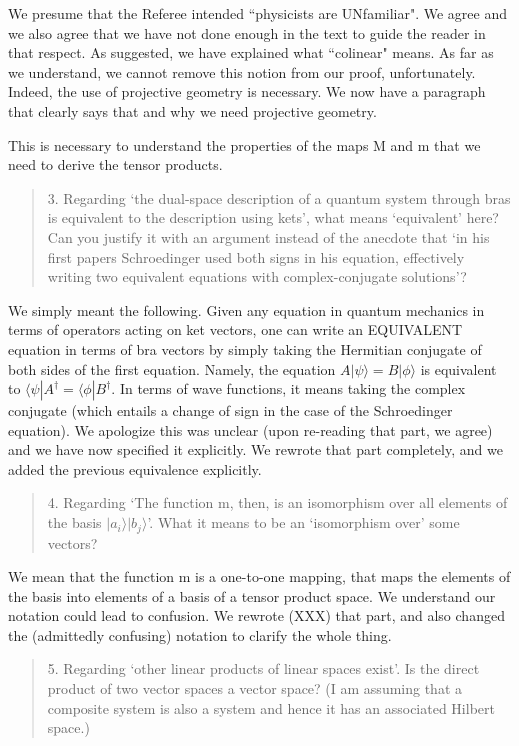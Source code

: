 \documentclass[11pt]{article}
\def\>{\rangle}
\def\<{\langle}
\begin{document}
We presume that the Referee intended ``physicists are UNfamiliar".  We
agree and we also agree that we have not done enough in the text to
guide the reader in that respect. As suggested, we have explained what
``colinear" means. As far as we understand, we cannot remove this
notion from our proof, unfortunately. Indeed, the use of projective
geometry is necessary. We now have a paragraph that clearly says that
and why we need projective geometry.

This is necessary to understand the properties of the maps M and m
that we need to derive the tensor products.

\begin{quote}
3. Regarding `the dual-space description of a quantum
system through bras is equivalent to the description using kets', what
means `equivalent' here? Can you justify it with an argument instead
of the anecdote that `in his first papers Schroedinger used both signs
in his equation, effectively writing two equivalent equations with
complex-conjugate solutions'?
\end{quote}

We simply meant the following. Given any equation in quantum mechanics
in terms of operators acting on ket vectors, one can write an
EQUIVALENT equation in terms of bra vectors by simply taking the
Hermitian conjugate of both sides of the first equation. Namely, the
equation $A|\psi\>=B|\phi\>$ is equivalent to $\<\psi|A^\dag=\<\phi|B^\dag$. In
terms of wave functions, it means taking the complex conjugate (which
entails a change of sign in the case of the Schroedinger equation). We
apologize this was unclear (upon re-reading that part, we agree) and
we have now specified it explicitly. We rewrote that part completely,
and we added the previous equivalence explicitly.

\begin{quote}
4. Regarding `The function m, then, is an isomorphism over
all elements of the basis $|a_i\>|b_j\>$'. What it means to be an
`isomorphism over' some vectors?
\end{quote}

We mean that the function m is a one-to-one mapping, that maps the
elements of the basis into elements of a basis of a tensor product
space. We understand our notation could lead to confusion. We rewrote (XXX) that part, and also changed the (admittedly confusing)
notation to clarify the whole thing.

\begin{quote}
5. Regarding `other linear products of linear spaces
exist'. Is the direct product of two vector spaces a vector space? (I
am assuming that a composite system is also a system and hence it has
an associated Hilbert space.)
\end{quote}
\end{document}
